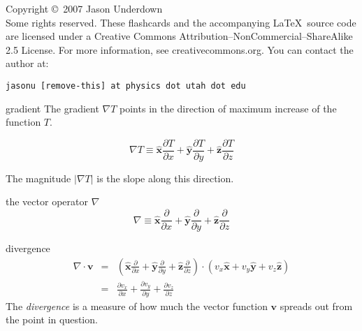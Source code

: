 \documentclass[avery5371,grid]{flashcards}
\newcommand{\xhat}[0]{\mathbf{\hat x}}
\newcommand{\yhat}[0]{\mathbf{\hat y}}
\newcommand{\zhat}[0]{\mathbf{\hat z}}
\begin{document}

\begin{flashcard}{Copyright \copyright \, 2007 Jason Underdown \\
Some rights reserved.}
These flashcards and the accompanying \LaTeX \, source code are licensed
under a Creative Commons Attribution--NonCommercial--ShareAlike 2.5 License.  
For more information, see creativecommons.org.  You can contact the author at:
\begin{center}
\begin{small}\tt jasonu [remove-this] at physics dot utah dot edu\end{small}
\end{center}
\end{flashcard}

\begin{flashcard}[Definition]{gradient}
The gradient $\nabla T$ points in the direction of maximum increase of the 
function $T$.

\medskip
\begin{displaymath}
\nabla T \equiv \xhat \frac{\partial T}{\partial x} +
\yhat \frac{\partial T}{\partial y} +
\zhat \frac{\partial T}{\partial z}
\end{displaymath}

\medskip
The magnitude $|\nabla T|$ is the slope along this direction.
\end{flashcard}

\begin{flashcard}[Definition]{the vector operator $\nabla$}
\begin{displaymath}
\nabla \equiv \xhat \frac{\partial}{\partial x} +
\yhat \frac{\partial}{\partial y} +
\zhat \frac{\partial}{\partial z}
\end{displaymath}
\end{flashcard}

\begin{flashcard}[Definition]{divergence}
\begin{eqnarray*}
\nabla \cdot \mathbf v &=& (\xhat \frac{\partial}{\partial x} +
\yhat \frac{\partial}{\partial y} +
\zhat \frac{\partial}{\partial z}) \cdot
(v_x \xhat + v_y \yhat + v_z \zhat)\\
&=& \frac{\partial v_x}{\partial x} +
\frac{\partial v_y}{\partial y} +
\frac{\partial v_z}{\partial z}
\end{eqnarray*}
The \textit{divergence} is a measure of how much the vector function
$\mathbf v$ spreads out from the point in question.
\end{flashcard}
\end{document}
